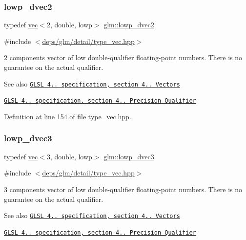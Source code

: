 \subsubsection{\texorpdfstring{lowp\+\_\+dvec2}{lowp\_dvec2}}
{\footnotesize\ttfamily typedef \hyperlink{structglm_1_1vec}{vec}$<$2, double, lowp$>$ \hyperlink{group__core__precision_gab2db907304a5b726a369c351e02357fe}{glm\+::lowp\+\_\+dvec2}}



{\ttfamily \#include $<$\hyperlink{type__vec_8hpp}{deps/glm/detail/type\+\_\+vec.\+hpp}$>$}

2 components vector of low double-\/qualifier floating-\/point numbers. There is no guarantee on the actual qualifier.

\begin{DoxySeeAlso}{See also}
\href{http://www.opengl.org/registry/doc/GLSLangSpec.4.20.8.pdf}{\tt G\+L\+SL 4.. specification, section 4.. Vectors} 

\href{http://www.opengl.org/registry/doc/GLSLangSpec.4.20.8.pdf}{\tt G\+L\+SL 4.. specification, section 4.. Precision Qualifier} 
\end{DoxySeeAlso}


Definition at line 154 of file type\+\_\+vec.\+hpp.

\mbox{\label{group__core__precision_gaf59ddbed824c80439be0a04a1a46d520}} 
\subsubsection{\texorpdfstring{lowp\+\_\+dvec3}{lowp\_dvec3}}
{\footnotesize\ttfamily typedef \hyperlink{structglm_1_1vec}{vec}$<$3, double, lowp$>$ \hyperlink{group__core__precision_gaf59ddbed824c80439be0a04a1a46d520}{glm\+::lowp\+\_\+dvec3}}



{\ttfamily \#include $<$\hyperlink{type__vec_8hpp}{deps/glm/detail/type\+\_\+vec.\+hpp}$>$}

3 components vector of low double-\/qualifier floating-\/point numbers. There is no guarantee on the actual qualifier.

\begin{DoxySeeAlso}{See also}
\href{http://www.opengl.org/registry/doc/GLSLangSpec.4.20.8.pdf}{\tt G\+L\+SL 4.. specification, section 4.. Vectors} 

\href{http://www.opengl.org/registry/doc/GLSLangSpec.4.20.8.pdf}{\tt G\+L\+SL 4.. specification, section 4.. Precision Qualifier} 
\end{DoxySeeAlso}


